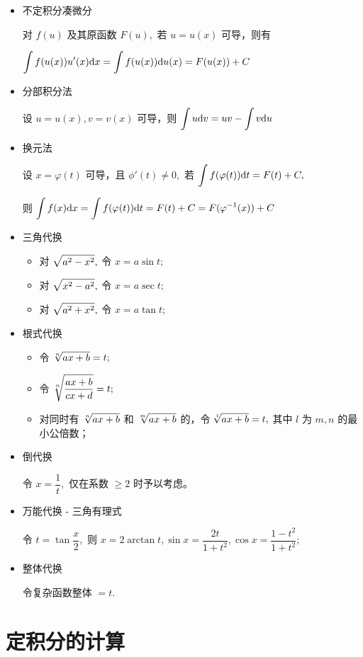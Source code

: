 \begin{itemize}
    \item 不定积分凑微分
    
    对 $ f(u) $ 及其原函数 $ F(u), $ 若 $ u = u(x) $ 可导，则有
    
    $ \displaystyle \int f(u(x))u'(x)\mathrm{d}x = \int f(u(x))\mathrm{d}u(x) = F(u(x)) + C $ 
    \item 分部积分法
    
    设 $ u = u(x), v = v(x) $ 可导，则 $ \displaystyle \int u\mathrm{d}v = uv - \int v\mathrm{d}u $ 
    \item 换元法
    
    设 $ x = \varphi(t) $ 可导，且 $ \phi'(t) \neq 0, $ 
    若 $ \displaystyle \int f(\varphi(t))\mathrm{d}t = F(t) + C, $

    则 $ \displaystyle \int f(x)\mathrm{d}x = \int f(\varphi(t))\mathrm{d}t = F(t) + C = F(\varphi^{-1}(x)) + C $ 
    \item 三角代换
    \begin{itemize}
        \item 对 $ \displaystyle\sqrt{a^2 - x^2}, $ 令 $ x = a\sin t; $ 
        \item 对 $ \displaystyle\sqrt{x^2 - a^2}, $ 令 $ x = a\sec t; $ 
        \item 对 $ \displaystyle\sqrt{a^2 + x^2}, $ 令 $ x = a\tan t; $ 
    \end{itemize}
    \item 根式代换
    \begin{itemize}
        \item 令 $ \displaystyle\sqrt[n]{ax+b} = t; $ 
        \item 令 $ \displaystyle\sqrt[n]{\dfrac{ax+b}{cx+d}} = t; $ 
        \item 对同时有 $ \displaystyle\sqrt[n]{ax+b} $ 和 $ \displaystyle\sqrt[m]{ax+b} $ 的，令
        $ \displaystyle\sqrt[l]{ax+b} = t, $ 其中 $ l $ 为 $ m,n $ 的最小公倍数；
    \end{itemize}
    \item 倒代换
    
    令 $ x = \dfrac{1}{t}, $ 仅在系数 $ \geq 2 $ 时予以考虑。
    \item 万能代换 - 三角有理式
    
    令 $ t = \tan \dfrac{x}{2}, $ 则 $ x = 2\arctan t, \sin x = \dfrac{2t}{1+t^2}, 
    \cos x = \dfrac{1-t^2}{1+t^2}; $
    \item 整体代换
    
    令复杂函数整体 $  = t. $ 
\end{itemize}

\section{定积分的计算}

